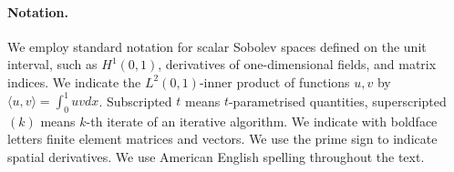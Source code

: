 \paragraph{Notation.} We employ standard notation for scalar Sobolev spaces defined on the unit interval, such as $H^1(0, 1)$, derivatives of one-dimensional fields, and matrix indices. We indicate the $L^2(0, 1)$-inner product of functions $u, v$ by $\langle u, v\rangle=\int_0^1 uv dx$. Subscripted $t$ means $t$-parametrised quantities, superscripted $(k)$ means $k$-th iterate of an iterative algorithm.
We indicate with boldface letters finite element matrices and vectors.
We use the prime sign to indicate spatial derivatives.
We use American English spelling throughout the text.
